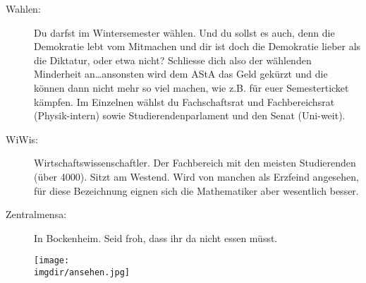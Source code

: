 \begin{description}
    \item[Wahlen:] Du darfst im Wintersemester wählen. Und du sollst es auch, denn die Demokratie lebt vom Mitmachen und dir ist doch die Demokratie lieber als die Diktatur, oder etwa nicht? Schliesse dich also der wählenden Minderheit an\ldots ansonsten wird dem AStA das Geld gekürzt und die können dann nicht mehr so viel machen, wie z.B. für euer Semesterticket kämpfen. Im Einzelnen wählst du Fachschaftsrat und Fachbereichsrat (Physik-intern) sowie Studierendenparlament und den Senat (Uni-weit).

    \item[WiWis:] Wirtschaftswissenschaftler. Der Fachbereich mit den meisten Studierenden (über 4000). Sitzt am Westend. Wird von manchen als Erzfeind angesehen, für diese Bezeichnung eignen sich die Mathematiker aber wesentlich besser.

	\item[Zentralmensa:] In Bockenheim. Seid froh, dass ihr da nicht essen müsst.

\begin{center}
    \texttt{[image: \\imgdir/ansehen.jpg]}
\end{center}
\end{description}